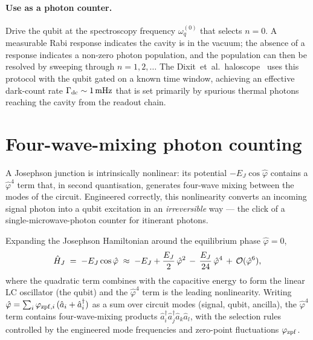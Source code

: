 \paragraph{Use as a photon counter.}
Drive the qubit at the spectroscopy frequency $\omega_q^{(0)}$
that selects $n=0$. A measurable Rabi response indicates the cavity
is in the vacuum; the absence of a response indicates a non-zero
photon population, and the population can then be resolved by
sweeping through $n=1,2,\dots$ The Dixit~et~al.\
haloscope~\cite{dixit2021} uses this protocol with the qubit gated
on a known time window, achieving an effective dark-count rate
$\Gamma_{\rm dc}\sim 1\,\text{mHz}$ that is set primarily by
spurious thermal photons reaching the cavity from the readout chain.

\section{Four-wave-mixing photon counting}
\label{sec:fwm-photon-counting}

\begin{phenomenon}
A Josephson junction is intrinsically nonlinear: its potential
$-E_J\cos\hat\varphi$ contains a $\hat\varphi^4$ term that, in
second quantisation, generates four-wave mixing between the modes
of the circuit. Engineered correctly, this nonlinearity converts
an incoming signal photon into a qubit excitation in an
\emph{irreversible} way --- the click of a single-microwave-photon
counter for itinerant photons.
\end{phenomenon}

\begin{statement}
\label{stmt:josephson-fwm}
Expanding the Josephson Hamiltonian around the equilibrium phase
$\hat\varphi=0$,
\begin{equation}
\label{eq:josephson-expansion}
\hat{H}_J \;=\; -E_J\cos\hat\varphi
\;\approx\; -E_J + \frac{E_J}{2}\,\hat\varphi^2
\,-\, \frac{E_J}{24}\,\hat\varphi^4
\,+\, \mathcal O(\hat\varphi^6),
\end{equation}
where the quadratic term combines with the capacitive energy to
form the linear LC oscillator (the qubit) and the $\hat\varphi^4$
term is the leading nonlinearity. Writing
$\hat\varphi=\sum_i \varphi_{{\rm zpf},i}\,(\hat a_i+\hat a_i^\dagger)$
as a sum over circuit modes (signal, qubit, ancilla), the
$\hat\varphi^4$ term contains four-wave-mixing products
$\hat a_i^\dagger \hat a_j^\dagger \hat a_k \hat a_l$, with the
selection rules controlled by the engineered mode frequencies
and zero-point fluctuations $\varphi_{{\rm zpf}}$.
\end{statement}

